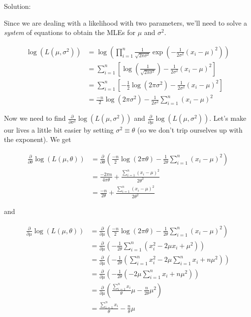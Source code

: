 \documentclass[
  letterpaper,
  DIV=11,
  numbers=noendperiod]{scrreprt}
\begin{document}
Solution:

Since we are dealing with a likelihood with two parameters, we'll need
to solve a \emph{system} of equations to obtain the MLEs for \(\mu\) and
\(\sigma^2\).

\begin{align*}
    \log(L(\mu, \sigma^2)) & = \log( \prod_{i = 1}^n \frac{1}{\sqrt{2\pi\sigma^2}} \exp(-\frac{1}{2\sigma^2} (x_i - \mu)^2) ) \\
    & = \sum_{i = 1}^n \left[ \log(\frac{1}{\sqrt{2\pi \sigma^2}})  - \frac{1}{2\sigma^2} (x_i - \mu)^2 \right] \\
    & = \sum_{i = 1}^n \left[ -\frac{1}{2} \log(2 \pi \sigma^2) - \frac{1}{2\sigma^2} (x_i - \mu)^2 \right] \\
    & = \frac{-n}{2} \log(2\pi \sigma^2) - \frac{1}{2\sigma^2} \sum_{i = 1}^n (x_i - \mu)^2
\end{align*}

Now we need to find
\(\frac{\partial}{\partial \sigma^2}\log(L(\mu, \sigma^2))\) and
\(\frac{\partial}{\partial \mu}\log(L(\mu, \sigma^2))\). Let's make our
lives a little bit easier by setting \(\sigma^2 \equiv \theta\) (so we
don't trip ourselves up with the exponent). We get

\begin{align*}
    \frac{\partial}{\partial \theta}\log(L(\mu, \theta)) & = \frac{\partial}{\partial \theta} \left(\frac{-n}{2} \log(2\pi \theta) - \frac{1}{2\theta} \sum_{i = 1}^n (x_i - \mu)^2 \right)\\
    & = \frac{-2\pi n}{4 \pi \theta} + \frac{\sum_{i = 1}^n (x_i - \mu)^2 }{2 \theta^2} \\
    & = \frac{-n}{2 \theta} + \frac{\sum_{i = 1}^n (x_i - \mu)^2 }{2 \theta^2}
\end{align*}

and

\begin{align*}
    \frac{\partial}{\partial \mu}\log(L(\mu, \theta)) & = \frac{\partial}{\partial \mu} \left(\frac{-n}{2} \log(2\pi \theta) - \frac{1}{2\theta} \sum_{i = 1}^n (x_i - \mu)^2 \right)\\
    & = \frac{\partial}{\partial \mu} \left( -\frac{1}{2\theta} \sum_{i = 1}^n (x_i^2 - 2 \mu x_i + \mu^2)\right) \\
    & = \frac{\partial}{\partial \mu} \left( -\frac{1}{2\theta} ( \sum_{i = 1}^n x_i^2 - 2 \mu \sum_{i = 1}^n x_i + n\mu^2 )\right) \\
    & = \frac{\partial}{\partial \mu} \left( -\frac{1}{2\theta} (- 2 \mu \sum_{i = 1}^n x_i + n\mu^2 ) \right) \\
    & = \frac{\partial}{\partial \mu} \left(   \frac{\sum_{i = 1}^n x_i}{\theta} \mu - \frac{n}{2\theta}\mu^2  \right) \\
    & = \frac{\sum_{i = 1}^n x_i}{\theta} - \frac{n}{\theta} \mu
\end{align*}
\end{document}
